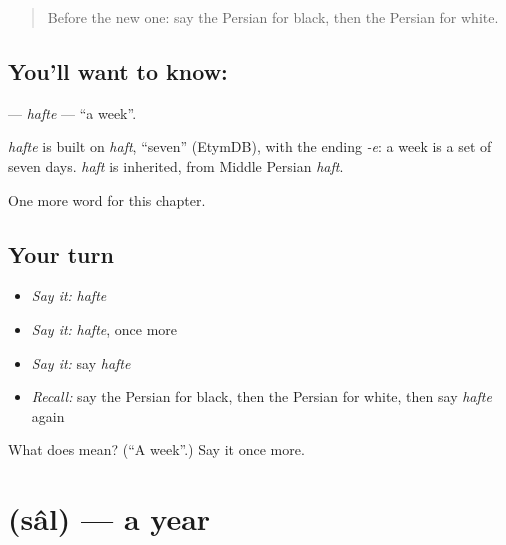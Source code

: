 \label{lesson:FA-C64-hafte}



\begin{quote}
Before the new one: say the Persian for black, then the Persian for white.
\end{quote}

\subsection*{You'll want to know: }
\textbf{} — \emph{hafte} — \textquotedblleft{}a week\textquotedblright{}.

\begin{cousinweb}
\emph{hafte} is built on \emph{haft}, \textquotedblleft{}seven\textquotedblright{} (EtymDB), with the ending \emph{-e}: a week is a set of seven days. \emph{haft} is inherited, from Middle Persian \emph{haft}.
\end{cousinweb}

\begin{grammarlens}[title={What you've built}]
One more word for this chapter.
\end{grammarlens}

\subsection*{Your turn}
\begin{itemize}
\raggedright
  \item \emph{Say it:} \emph{hafte}
  \item \emph{Say it:} \emph{hafte}, once more
  \item \emph{Say it:} say \emph{hafte}
  \item \emph{Recall:} say the Persian for black, then the Persian for white, then say \emph{hafte} again
\end{itemize}

\begin{tcolorbox}[breakable,colback=teal!4,colframe=teal!35!black,title={Before you move on}]
What does  mean? (\textquotedblleft{}A week\textquotedblright{}.) Say it once more.
\end{tcolorbox}
\section[\texorpdfstring{\fa{سال} (sâl)}{سال (sâl)}]{ (sâl) — a year}

\label{lesson:FA-C64-sal}



